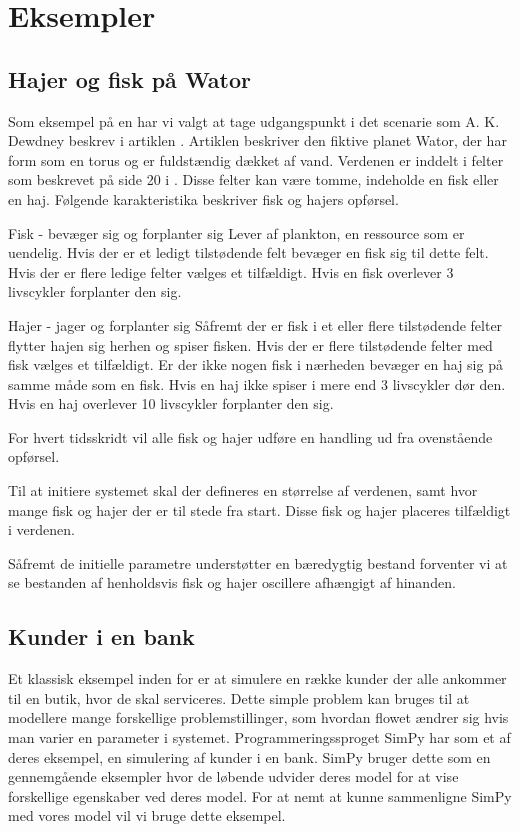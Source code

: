\chapter{Eksempler}

\section{Hajer og fisk på Wator} Som eksempel på en \des har vi valgt at tage 
udgangspunkt i det scenarie som A. K. Dewdney
beskrev i artiklen . Artiklen beskriver den
fiktive planet Wator, der har form som en torus og er fuldstændig
dækket af vand. Verdenen er inddelt i felter som beskrevet på side
20 i . Disse felter kan være tomme, indeholde en
fisk eller en haj. Følgende karakteristika beskriver fisk og hajers
opførsel.


Fisk - bevæger sig og forplanter sig Lever af plankton, en ressource
som er uendelig. Hvis der er et ledigt tilstødende felt bevæger en
fisk sig til dette felt. Hvis der er flere ledige felter vælges et
tilfældigt. Hvis en fisk overlever 3 livscykler forplanter den sig.


Hajer - jager og forplanter sig Såfremt der er fisk i et eller flere
tilstødende felter flytter hajen sig herhen og spiser fisken. Hvis der
er flere tilstødende felter med fisk vælges et tilfældigt. Er der
ikke nogen fisk i nærheden bevæger en haj sig på samme måde som en
fisk. Hvis en haj ikke spiser i mere end 3 livscykler dør den. Hvis en
haj overlever 10 livscykler forplanter den sig.

For hvert tidsskridt vil alle fisk og hajer udføre en handling ud fra
ovenstående opførsel.

Til at initiere systemet skal der defineres en størrelse af verdenen,
samt hvor mange fisk og hajer der er til stede fra start. Disse fisk og
hajer placeres tilfældigt i verdenen.

Såfremt de initielle parametre understøtter en bæredygtig bestand
forventer vi at se bestanden af henholdsvis fisk og hajer oscillere
afhængigt af hinanden.

\section{Kunder i en bank} Et klassisk eksempel inden for \des er at simulere  
en række kunder der alle ankommer til en butik, hvor de skal serviceres. Dette 
simple problem kan bruges til at modellere mange forskellige 
problemstillinger, som hvordan flowet ændrer sig hvis man varier en parameter 
i systemet. Programmeringssproget SimPy har som et af deres eksempel, en 
simulering af kunder i en bank. SimPy bruger dette som en gennemgående 
eksempler hvor de løbende udvider deres model for at vise forskellige 
egenskaber ved deres model. For at nemt at kunne sammenligne SimPy  med vores 
model vil vi bruge dette eksempel.

